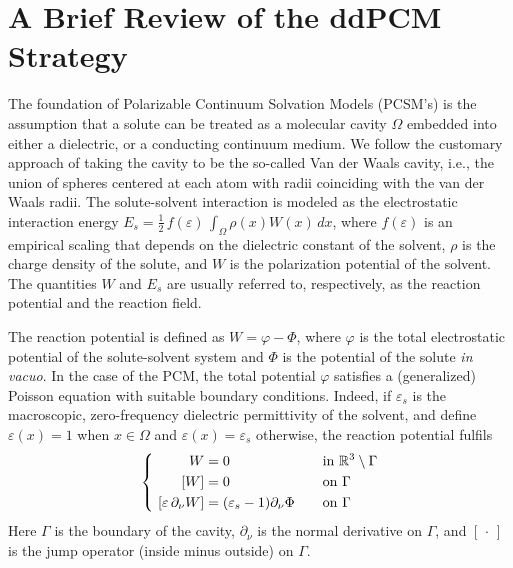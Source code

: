 \section{A Brief Review of the ddPCM Strategy}\label{sec:review}

The foundation of Polarizable Continuum Solvation Models (PCSM's) is the assumption that a solute can be treated as a molecular cavity $\Omega$ embedded into either a dielectric, or a conducting continuum medium. We follow the customary approach of taking the cavity to be the so-called Van der Waals cavity\cite{ReviewPCM_2005}, i.e., the union of spheres centered at each atom with radii coinciding with the van der Waals radii. The solute-solvent interaction is modeled as the electrostatic interaction energy $E_s = \tfrac{1}{2}\, f(\varepsilon)\,\int_\Omega \rho(x) W(x) \, dx$, where $f(\varepsilon)$ is an empirical scaling that depends on the dielectric constant of the solvent, $\rho$ is the charge density of the solute, and $W$ is the polarization potential of the solvent. The quantities $W$ and $E_s$ are usually referred to, respectively, as the reaction potential and the reaction field. 

The reaction potential is defined as $W = \varphi - \Phi$, where $\varphi$ is the total electrostatic potential of the solute-solvent system and $\Phi$ is the potential of the solute \emph{in vacuo}. In the case of the PCM, the total potential $\varphi$ satisfies a (generalized) Poisson equation with suitable boundary conditions\cite{Mennucci_JCP_IEF1,Mennucci_JMC_IEF2}. Indeed, if $\varepsilon_s$ is the macroscopic, zero-frequency dielectric permittivity of the solvent, and define $\varepsilon(x) = 1$ when $x \in \Omega$ and $\varepsilon(x) = \varepsilon_s$ otherwise, the reaction potential fulfils 
\begin{equation} 
\label{eq:pcmpde}
\left \{ 
\begin{alignedat}
 \Delta W &= 0  &&\mbox{in } \sR^3\setminus \Gamma  \\
 \ [W] &= 0  &&\mbox{on } \Gamma\\
\  [\varepsilon \, \partial_\nu W] &= (\varepsilon_s-1) \partial_\nu \Phi &\qquad& \mbox{on } \Gamma
\end{alignedat} 
\right.
\end{equation}
Here $\Gamma$ is the boundary of the cavity, $\partial_\nu$ is the normal derivative on $\Gamma$, and $[\,\cdot\,]$ is the jump operator (inside minus outside) on $\Gamma$.

